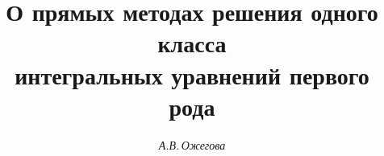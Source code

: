 









\newcommand{\tts}[1]{}







\setcounter{page}{75}















\author{\it А.В.\,Ожегова}




\title{О прямых методах решения одного класса\\


интегральных уравнений первого рода}





\date{}




\pagestyle{plain} %







\maketitle


\label{begin}





